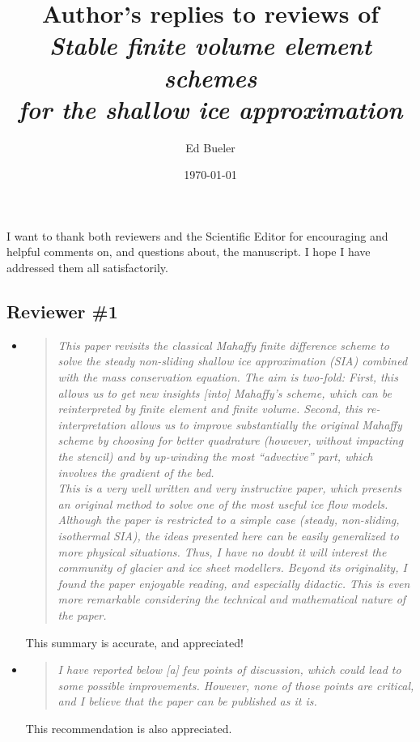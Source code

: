 \documentclass[11pt,reqno]{amsart}
\title[Author's replies to reviews of \emph{Stable finite volume element schemes \dots}]{Author's replies to reviews of \\ \emph{Stable finite volume element schemes} \\ \emph{for the shallow ice approximation}}
\author{Ed Bueler}
\date{\today}
\newcommand{\reply}[2]{
\medskip\medskip
\item  \begin{quote}
\emph{#1}
\end{quote}

\medskip
\noindent #2}
\begin{document}
\maketitle

\thispagestyle{empty}



I want to thank both reviewers and the Scientific Editor for encouraging and helpful comments on, and questions about, the manuscript.  I hope I have addressed them all satisfactorily.


\subsection*{Reviewer \#1}  \begin{itemize}
\reply{This paper revisits the classical Mahaffy finite difference scheme to solve the steady
non-sliding shallow ice approximation (SIA) combined with the mass conservation equation.  The aim is two-fold: First, this allows us to get new insights [into] Mahaffy's
scheme, which can be reinterpreted by finite element and finite volume. Second, this
re-interpretation allows us to improve substantially the original Mahaffy scheme by
choosing for better quadrature (however, without impacting the stencil) and by up-winding the most ``advective'' part, which involves the gradient of the bed.\\
This is a very well written and very instructive paper, which presents an original
method to solve one of the most useful ice flow models. Although the paper is restricted
to a simple case (steady, non-sliding, isothermal SIA), the ideas presented here can be
easily generalized to more physical situations. Thus, I have no doubt it will interest the
community of glacier and ice sheet modellers. Beyond its originality, I found the paper
enjoyable reading, and especially didactic. This is even more remarkable considering
the technical and mathematical nature of the paper.}
{This summary is accurate, and appreciated!}

\reply{I have reported below [a] few points of discussion, which could lead to some possible
improvements. However, none of those points are critical, and I believe that the paper
can be published as it is.}
{This recommendation is also appreciated.}


\end{itemize}
\end{document}
